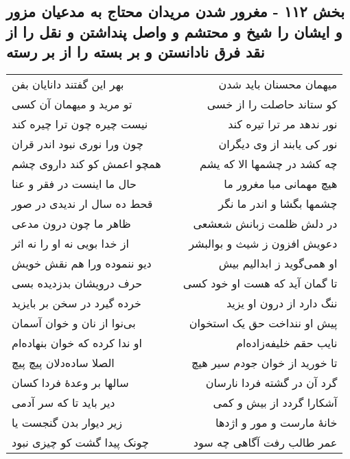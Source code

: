 \begin{center}
\section*{بخش ۱۱۲ - مغرور شدن مریدان محتاج به مدعیان مزور و ایشان را شیخ و محتشم و واصل پنداشتن و نقل را از نقد فرق نادانستن و بر بسته را از بر رسته}
\label{sec:sh112}
\begin{longtable}{l p{0.5cm} r}
بهر این گفتند دانایان بفن
&&
میهمان محسنان باید شدن
\\
تو مرید و میهمان آن کسی
&&
کو ستاند حاصلت را از خسی
\\
نیست چیره چون ترا چیره کند
&&
نور ندهد مر ترا تیره کند
\\
چون ورا نوری نبود اندر قران
&&
نور کی یابند از وی دیگران
\\
همچو اعمش کو کند داروی چشم
&&
چه کشد در چشمها الا که یشم
\\
حال ما اینست در فقر و عنا
&&
هیچ مهمانی مبا مغرور ما
\\
قحط ده سال ار ندیدی در صور
&&
چشمها بگشا و اندر ما نگر
\\
ظاهر ما چون درون مدعی
&&
در دلش ظلمت زبانش شعشعی
\\
از خدا بویی نه او را نه اثر
&&
دعویش افزون ز شیث و بوالبشر
\\
دیو ننموده ورا هم نقش خویش
&&
او همی‌گوید ز ابدالیم بیش
\\
حرف درویشان بدزدیده بسی
&&
تا گمان آید که هست او خود کسی
\\
خرده گیرد در سخن بر بایزید
&&
ننگ دارد از درون او یزید
\\
بی‌نوا از نان و خوان آسمان
&&
پیش او ننداخت حق یک استخوان
\\
او ندا کرده که خوان بنهاده‌ام
&&
نایب حقم خلیفه‌زاده‌ام
\\
الصلا ساده‌دلان پیچ پیچ
&&
تا خورید از خوان جودم سیر هیچ
\\
سالها بر وعدهٔ فردا کسان
&&
گرد آن در گشته فردا نارسان
\\
دیر باید تا که سر آدمی
&&
آشکارا گردد از بیش و کمی
\\
زیر دیوار بدن گنجست یا
&&
خانهٔ مارست و مور و اژدها
\\
چونک پیدا گشت کو چیزی نبود
&&
عمر طالب رفت آگاهی چه سود
\\
\end{longtable}
\end{center}
